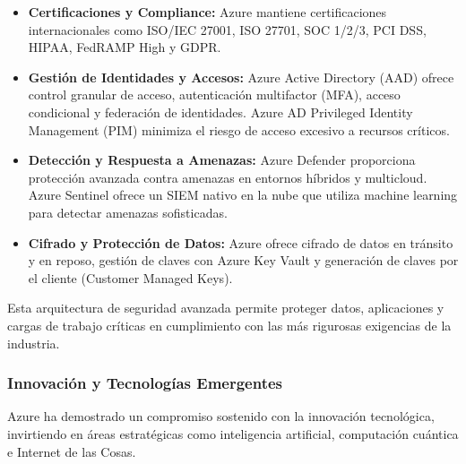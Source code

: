 {                \begin{itemize}
                    \item \textbf{Certificaciones y Compliance:} Azure mantiene certificaciones internacionales como ISO/IEC 27001, ISO 27701, SOC 1/2/3, PCI DSS, HIPAA, FedRAMP High y GDPR.
                    \item \textbf{Gestión de Identidades y Accesos:} Azure Active Directory (AAD) ofrece control granular de acceso, autenticación multifactor (MFA), acceso condicional y federación de identidades. Azure AD Privileged Identity Management (PIM) minimiza el riesgo de acceso excesivo a recursos críticos.
                    \item \textbf{Detección y Respuesta a Amenazas:} Azure Defender proporciona protección avanzada contra amenazas en entornos híbridos y multicloud. Azure Sentinel ofrece un SIEM nativo en la nube que utiliza machine learning para detectar amenazas sofisticadas.
                    \item \textbf{Cifrado y Protección de Datos:} Azure ofrece cifrado de datos en tránsito y en reposo, gestión de claves con Azure Key Vault y generación de claves por el cliente (Customer Managed Keys).
                \end{itemize}
    
                Esta arquitectura de seguridad avanzada permite proteger datos, aplicaciones y cargas de trabajo críticas en cumplimiento con las más rigurosas exigencias de la industria.
                    
            \subsubsection{Innovación y Tecnologías Emergentes}
                Azure ha demostrado un compromiso sostenido con la innovación tecnológica, invirtiendo en áreas estratégicas como inteligencia artificial, computación cuántica e Internet de las Cosas.
                    
}

